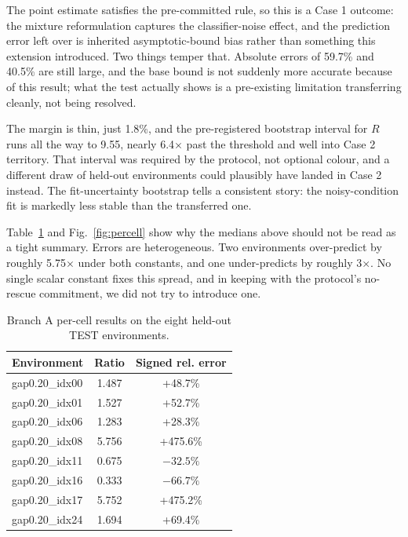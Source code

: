 \documentclass[conference]{IEEEtran}
\begin{document}
The point estimate satisfies the pre-committed rule, so this is a Case 1
outcome: the mixture reformulation captures the classifier-noise effect,
and the prediction error left over is inherited asymptotic-bound bias
rather than something this extension introduced. Two things temper that.
Absolute errors of 59.7\% and 40.5\% are still large, and the base bound
is not suddenly more accurate because of this result; what the test
actually shows is a pre-existing limitation transferring cleanly, not
being resolved.

The margin is thin, just 1.8\%, and the pre-registered bootstrap interval
for $R$ runs all the way to 9.55, nearly 6.4$\times$ past the threshold
and well into Case 2 territory. That interval was required by the
protocol, not optional colour, and a different draw of held-out
environments could plausibly have landed in Case 2 instead. The
fit-uncertainty bootstrap tells a consistent story: the noisy-condition
fit is markedly less stable than the transferred one.

Table~\ref{tab:percell} and Fig.~\ref{fig:percell} show why the medians
above should not be read as a tight summary. Errors are heterogeneous.
Two environments over-predict by roughly 5.75$\times$ under both
constants, and one under-predicts by roughly 3$\times$. No single scalar
constant fixes this spread, and in keeping with the protocol's no-rescue
commitment, we did not try to introduce one.

\begin{table}[t]
\centering
\caption{Branch A per-cell results on the eight held-out TEST
environments.}
\label{tab:percell}
\footnotesize
\begin{tabular}{lcc}
\hline
\textbf{Environment} & \textbf{Ratio} & \textbf{Signed rel. error} \\
\hline
gap0.20\_idx00 & 1.487 & +48.7\% \\
gap0.20\_idx01 & 1.527 & +52.7\% \\
gap0.20\_idx06 & 1.283 & +28.3\% \\
gap0.20\_idx08 & 5.756 & +475.6\% \\
gap0.20\_idx11 & 0.675 & $-32.5\%$ \\
gap0.20\_idx16 & 0.333 & $-66.7\%$ \\
gap0.20\_idx17 & 5.752 & +475.2\% \\
gap0.20\_idx24 & 1.694 & +69.4\% \\
\hline
\end{tabular}
\end{table}
\end{document}
